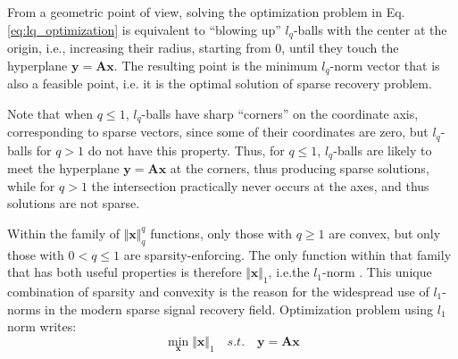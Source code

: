 \documentclass[journal]{IEEEtran}
\begin{document}
From a geometric point of view, solving the optimization problem in Eq. \ref{eq:lq_optimization} is equivalent to “blowing up” $l_q$-balls with the center at the origin, i.e., increasing their radius, starting from 0, until they touch the hyperplane $\boldsymbol{y}=\boldsymbol{A} \boldsymbol{x}$. The resulting point is the minimum $l_q$-norm vector that is also a feasible point, i.e. it is the optimal solution of sparse recovery problem.

Note that when $q\leq 1$, $l_q$-balls have sharp “corners” on the coordinate axis, corresponding to sparse vectors, since some of their coordinates are zero, but $l_q$-balls for $q>1$ do not have this property. Thus, for $q \leq 1$, $l_q$-balls are likely to meet the hyperplane $\boldsymbol{y}=\boldsymbol{A} \boldsymbol{x}$ at the corners, thus producing sparse solutions, while for $q>1$ the intersection practically never occurs at the axes, and thus solutions are not sparse.

Within the family of $\Vert \boldsymbol{x}\Vert_q^q$ functions, only those with $q\geq 1$ are convex, but only those with $0<q\leq 1$ are sparsity-enforcing. The only function within that family that has both useful properties is therefore $\Vert \boldsymbol{x}\Vert_1$, i.e.the $l_1$-norm \cite{Rish2015}. This unique combination of sparsity and convexity is the reason for the widespread use of $l_1$-norms in the modern sparse signal recovery field. Optimization problem using $l_1$ norm writes:
\begin{equation} \label{eq:l1_optimization}
	\min\limits_{\boldsymbol{x}}\Vert \boldsymbol{x}\Vert_1 \quad s.t. \quad \boldsymbol{y}=\boldsymbol{A} \boldsymbol{x}
\end{equation}



\end{document}
